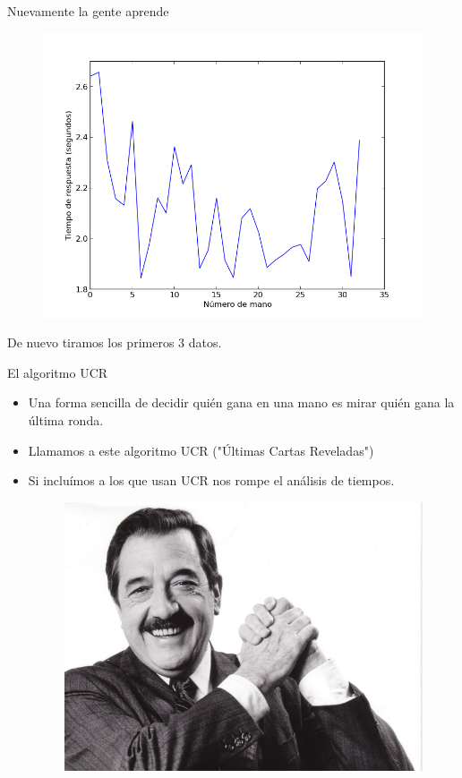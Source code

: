 \documentclass{beamer}
\begin{document}
\begin{frame}{Nuevamente la gente aprende}
\begin{figure}
   \includegraphics[width=0.8\linewidth]{graficos/tiempo_por_mano.png}
\end{figure}
\begin{center}De nuevo tiramos los primeros 3 datos.
\end{center}
\end{frame}


\begin{frame}{El algoritmo UCR}
\begin{itemize}
\item Una forma sencilla de decidir quién gana en una mano es mirar quién gana la última ronda.
\item Llamamos a este algoritmo UCR ("Últimas Cartas Reveladas")
\item Si incluímos a los que usan UCR nos rompe el análisis de tiempos.
\pause

\begin{figure}
	\includegraphics[width=0.7\linewidth]{alfonsin.jpg}
\end{figure}

\end{itemize}
\end{frame}
\end{document}
